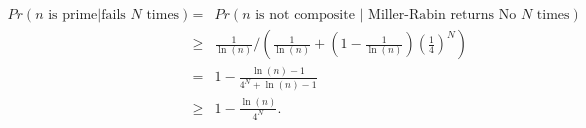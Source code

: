 \documentclass[12pt]{ut-thesis}
\theoremstyle{definition}
\begin{document}
	\begin{eqnarray*}
		Pr(n \text{ is prime} | \text{fails } N \text{ times})&=&Pr(n \text{ is not composite } | \text{ Miller-Rabin returns No } N \text{ times}) \\
		&\ge&\frac{1}{\ln(n)} \bigg/ \left( \frac{1}{\ln(n)} + \left( 1 - \frac{1}{\ln(n)} \right) \left(\frac{1}{4}\right)^N \right)\\
		&=& 1 - \frac{\ln(n)-1}{4^N + \ln(n)-1}\\
		&\ge& 1 - \frac{\ln(n)}{4^N}.
	\end{eqnarray*}
	
	
\end{document}
